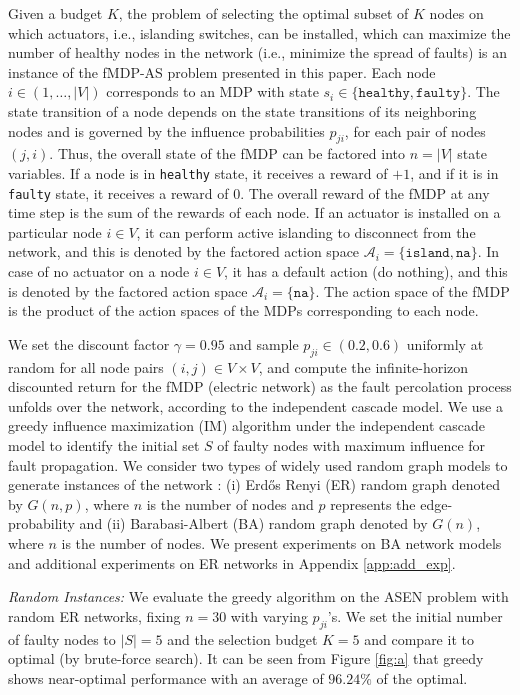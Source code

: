 \documentclass[twocolumn]{autart}    %
\begin{document}
Given a budget $K$, the problem of selecting the optimal subset of $K$ nodes on which actuators, i.e., islanding switches, can be installed, which can maximize the number of healthy nodes in the network (i.e., minimize the spread of faults) is an instance of the fMDP-AS problem presented in this paper. Each node $ i \in (1, \hdots, |V|) $ corresponds to an MDP with state $s_i \in \{ \texttt{healthy}, \texttt{faulty} \}$. The state transition of a node depends on the state transitions of its neighboring nodes and is governed by the influence probabilities $p_{ji}$, for each pair of nodes $(j,i)$. Thus, the overall state of the fMDP can be factored into $n = |V|$ state variables. If a node is in \texttt{healthy} state, it receives a reward of $+1$, and if it is in \texttt{faulty} state, it receives a reward of $0$.  The overall reward of the fMDP at any time step is the sum of the rewards of each node. If an actuator is installed on a particular node $i \in V$, it can perform active islanding to disconnect from the network, and this is denoted by the factored action space $\mathcal{A}_i = \{ \texttt{island}, \texttt{na} \}$. In case of no actuator on a node $i \in V$, it has a default action (do nothing), and this is denoted by the factored action space $\mathcal{A}_i = \{\texttt{na} \}$. The action space of the fMDP is the product of the action spaces of the MDPs corresponding to each node.

We set the discount factor $\gamma=0.95$ and sample $p_{ji} \in (0.2, 0.6)$ uniformly at random for all node pairs $(i,j) \in V \times V$, and compute the infinite-horizon discounted return for the fMDP (electric network) as the fault percolation process unfolds over the network, according to the independent cascade model. We use a greedy influence maximization (IM) algorithm under the independent cascade model to identify the initial set $S$ of faulty nodes with maximum influence for fault propagation. We consider two types of widely used random graph models to generate instances of the network \cite{jelenius2004graph}: (i) Erdős Renyi (ER) random graph denoted by $G(n,p)$, where $n$ is the number of nodes and $p$ represents the edge-probability and (ii) Barabasi-Albert (BA) random graph denoted by $G(n)$, where $n$ is the number of nodes. {We present experiments on  BA network models and additional experiments on ER networks  in Appendix \ref{app:add_exp}.} 

 \textit{Random Instances: } We evaluate the greedy algorithm on the ASEN problem with random ER networks, fixing  $n=30$ with varying $p_{ji}$'s. We set the initial number of faulty nodes to $|S| = 5$ and the selection budget $K=5$ and compare it to optimal (by brute-force search). It can be seen from Figure \ref{fig:a} that greedy shows near-optimal performance  with an average of $96.24\%$ of the optimal.
\end{document}
